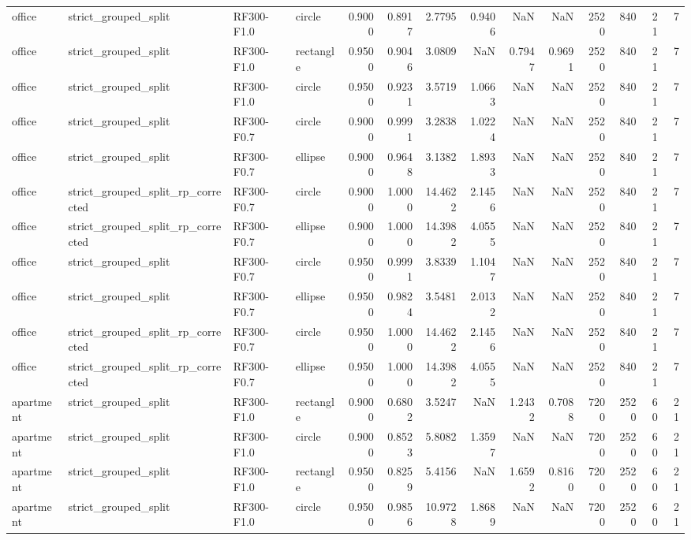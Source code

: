 \begin{tabular}{llllrrrrrrrrrr}
office & strict\_grouped\_split & RF300-F1.0 & circle & 0.9000 & 0.8917 & 2.7795 & 0.9406 & NaN & NaN & 2520 & 840 & 21 & 7 \\
office & strict\_grouped\_split & RF300-F1.0 & rectangle & 0.9500 & 0.9046 & 3.0809 & NaN & 0.7947 & 0.9691 & 2520 & 840 & 21 & 7 \\
office & strict\_grouped\_split & RF300-F1.0 & circle & 0.9500 & 0.9231 & 3.5719 & 1.0663 & NaN & NaN & 2520 & 840 & 21 & 7 \\
office & strict\_grouped\_split & RF300-F0.7 & circle & 0.9000 & 0.9991 & 3.2838 & 1.0224 & NaN & NaN & 2520 & 840 & 21 & 7 \\
office & strict\_grouped\_split & RF300-F0.7 & ellipse & 0.9000 & 0.9648 & 3.1382 & 1.8933 & NaN & NaN & 2520 & 840 & 21 & 7 \\
office & strict\_grouped\_split\_rp\_corrected & RF300-F0.7 & circle & 0.9000 & 1.0000 & 14.4622 & 2.1456 & NaN & NaN & 2520 & 840 & 21 & 7 \\
office & strict\_grouped\_split\_rp\_corrected & RF300-F0.7 & ellipse & 0.9000 & 1.0000 & 14.3982 & 4.0555 & NaN & NaN & 2520 & 840 & 21 & 7 \\
office & strict\_grouped\_split & RF300-F0.7 & circle & 0.9500 & 0.9991 & 3.8339 & 1.1047 & NaN & NaN & 2520 & 840 & 21 & 7 \\
office & strict\_grouped\_split & RF300-F0.7 & ellipse & 0.9500 & 0.9824 & 3.5481 & 2.0132 & NaN & NaN & 2520 & 840 & 21 & 7 \\
office & strict\_grouped\_split\_rp\_corrected & RF300-F0.7 & circle & 0.9500 & 1.0000 & 14.4622 & 2.1456 & NaN & NaN & 2520 & 840 & 21 & 7 \\
office & strict\_grouped\_split\_rp\_corrected & RF300-F0.7 & ellipse & 0.9500 & 1.0000 & 14.3982 & 4.0555 & NaN & NaN & 2520 & 840 & 21 & 7 \\
apartment & strict\_grouped\_split & RF300-F1.0 & rectangle & 0.9000 & 0.6802 & 3.5247 & NaN & 1.2432 & 0.7088 & 7200 & 2520 & 60 & 21 \\
apartment & strict\_grouped\_split & RF300-F1.0 & circle & 0.9000 & 0.8523 & 5.8082 & 1.3597 & NaN & NaN & 7200 & 2520 & 60 & 21 \\
apartment & strict\_grouped\_split & RF300-F1.0 & rectangle & 0.9500 & 0.8259 & 5.4156 & NaN & 1.6592 & 0.8160 & 7200 & 2520 & 60 & 21 \\
apartment & strict\_grouped\_split & RF300-F1.0 & circle & 0.9500 & 0.9856 & 10.9728 & 1.8689 & NaN & NaN & 7200 & 2520 & 60 & 21 \\

\end{tabular}
